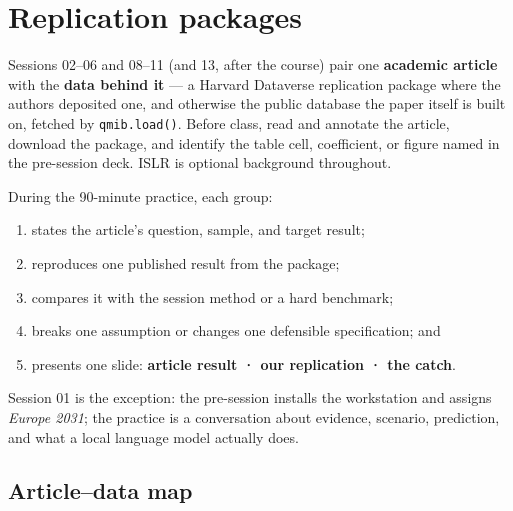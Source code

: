 \documentclass[
  letterpaper,
  10pt,
  twoside,
  openright,
  numbers=noenddot,
  chapterprefix=true]{scrbook}
\providecommand{\tightlist}{%
  \setlength{\itemsep}{0pt}\setlength{\parskip}{0pt}}
\begin{document}
\chapter{Replication packages}\label{replication-packages}

Sessions 02--06 and 08--11 (and 13, after the course) pair one
\textbf{academic article} with the \textbf{data behind it} --- a Harvard
Dataverse replication package where the authors deposited one, and
otherwise the public database the paper itself is built on, fetched by
\texttt{qmib.load()}. Before class, read and annotate the article,
download the package, and identify the table cell, coefficient, or
figure named in the pre-session deck. ISLR is optional background
throughout.

During the 90-minute practice, each group:

\begin{enumerate}
\def\labelenumi{\arabic{enumi}.}
\tightlist
\item
  states the article's question, sample, and target result;
\item
  reproduces one published result from the package;
\item
  compares it with the session method or a hard benchmark;
\item
  breaks one assumption or changes one defensible specification; and
\item
  presents one slide: \textbf{article result · our replication · the
  catch}.
\end{enumerate}

Session 01 is the exception: the pre-session installs the workstation
and assigns \emph{Europe 2031}; the practice is a conversation about
evidence, scenario, prediction, and what a local language model actually
does.

\section{Article--data map}\label{articledata-map}
\end{document}

